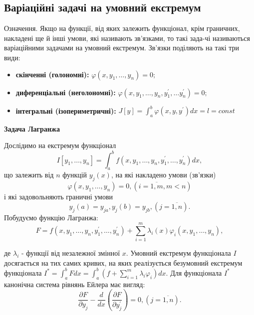 \documentclass[a4paper]{article}
\begin{document}
\subsection{Варіаційні задачі на умовний екстремум}

Означення. Якщо на функції, від яких залежить функціонал, крім граничних, накладені ще й інші умови,
які називають зв’язками, то такі зада-чі називаються варіаційними задачами на умовний екстремум.
Зв’язки поділяють на такі три види: 
\begin{itemize}
	\item \textbf{скінченні (голономні):} $\varphi(x, y_1,\ldots, y_n) = 0;$
	\item \textbf{диференціальні (неголономні):}
	      $\varphi(x, y_1, \ldots, y_n, y^{'}_1, \ldots y^{'}_n) = 0;$
	\item \textbf{інтегральні (ізопериметричні):} 
	      $J[y] = \int_{a}^{b} \varphi(x, y, y^{'})dx = l = const$
\end{itemize}

	      \begin{center}
	      	\textbf{Задача Лагранжа}
	      \end{center}
	      
	      Дослідимо на екстремум функціонал
	      \begin{equation}
	      	I[y_1, \ldots, y_n] = \int_{a}^{b} f(x, y_1, \ldots, y_n, y_1^{'}, \ldots, y_n^{'})dx,
	      \end{equation}
	      що залежить від $n$ функцій $y_j(x)$, на які накладено умови (зв’язки)
	      $$\varphi(x, y_1, \ldots, y_n) = 0, (i = \overline{1,m}, m < n)$$
	      і які задовольняють граничні умови
	      $$y_j(a) = y_{ja}, y_j(b) = y_{jb}, (j=\overline{1,n}).$$
	      Побудуємо функцію Лагранжа:
			\begin{equation}
	      		F = f(x, y_1, \ldots, y_n, y^{'}_1, \ldots, y^{'}_n) + 
	      		\sum_{i=1}^{m} \lambda_i(x) \varphi_i(x, y_1, \ldots, y_n),    			
			\end{equation}				      

	     
	      де $\lambda_i$ - функції від незалежної змінної $x$. Умовний екстремум функціонала $I$ 			  досягається на тих самих кривих, на яких реалізується безумовний екстремум функціонала
	     $I^{*} = \int_{a}^{b} Fdx = \int_{a}^{b} \left(f + \sum_{i=1}^{m} \lambda_i \varphi_i \right)dx$. Для функціонала $I^{*}$ канонічна система рівнянь Ейлера має вигляд:
	     \begin{equation}\label{eq:system_of_Euler_equations}
			\frac{\partial F}{\partial y_j} - \frac{d}{dx} \left(\frac{\partial F}{\partial y^{'}_j}\right) = 0, (j = \overline{1, n}).
		 \end{equation}
	      
\end{document}
